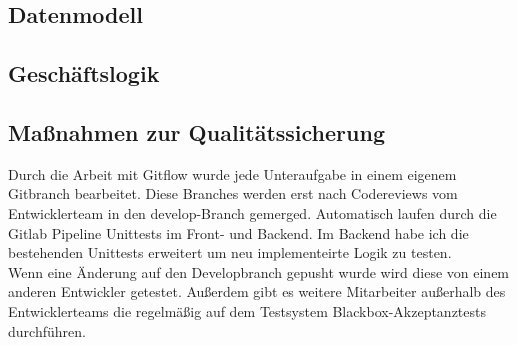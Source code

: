 \subsection{Datenmodell}
\label{datenmodell}

\subsection{Geschäftslogik}
\label{geschaeftslogik}

\subsection{Maßnahmen zur Qualitätssicherung}
\label{qualitaetssicherung}
Durch die Arbeit mit Gitflow wurde jede Unteraufgabe in einem eigenem Gitbranch bearbeitet. Diese Branches werden erst nach Codereviews vom Entwicklerteam in den develop-Branch gemerged.  Automatisch laufen durch die Gitlab Pipeline Unittests im Front- und Backend. Im Backend habe ich die bestehenden Unittests erweitert um neu implementeirte Logik zu testen.\\
Wenn eine Änderung auf den Developbranch gepusht wurde wird diese von einem anderen Entwickler getestet. Außerdem gibt es weitere Mitarbeiter außerhalb des Entwicklerteams die regelmäßig auf dem Testsystem Blackbox-Akzeptanztests durchführen.